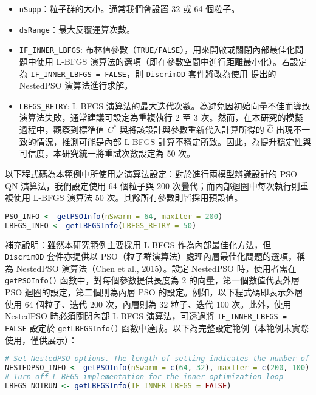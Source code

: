 \begin{itemize}
\item \verb|nSupp|：粒子群的大小。通常我們會設置 32 或 64 個粒子。

\item \verb|dsRange|：最大反覆運算次數。

\item \verb|IF_INNER_LBFGS|: 布林值參數（\verb|TRUE/FALSE|），用來開啟或關閉內部最佳化問題中使用 L-BFGS 演算法的選項（即在參數空間中進行距離最小化）。若設定為 \verb|IF_INNER_LBFGS = FALSE|，則 \verb|DiscrimOD| 套件將改為使用 \cite{chen2015minimax} 提出的 NestedPSO 演算法進行求解。

\item \verb|LBFGS_RETRY|: L-BFGS 演算法的最大迭代次數。為避免因初始向量不佳而導致演算法失敗，通常建議可設定為重複執行 2 至 3 次。然而，在本研究的模擬過程中，觀察到標準值 $C^*$ 與將該設計與參數重新代入計算所得的 $\hat{C}$ 出現不一致的情況，推測可能是內部 L-BFGS 計算不穩定所致。因此，為提升穩定性與可信度，本研究統一將重試次數設定為 50 次。

\end{itemize}

以下程式碼為本範例中所使用之演算法設定：對於進行兩模型辨識設計的 PSO-QN 演算法，我們設定使用 64 個粒子與 200 次疊代；而內部迴圈中每次執行則重複使用 L-BFGS 演算法 50 次。其餘所有參數則皆採用預設值。

\begin{lstlisting}[language=R, caption={設定演算法參數（PSO 與 L-BFGS）}]
PSO_INFO <- getPSOInfo(nSwarm = 64, maxIter = 200)
LBFGS_INFO <- getLBFGSInfo(LBFGS_RETRY = 50)
\end{lstlisting}

補充說明：雖然本研究範例主要採用 L-BFGS 作為內部最佳化方法，但 \verb|DiscrimOD| 套件亦提供以 PSO（粒子群演算法）處理內層最佳化問題的選項，稱為 NestedPSO 演算法（Chen et al., 2015）。設定 NestedPSO 時，使用者需在 \verb|getPSOInfo()| 函數中，對每個參數提供長度為 2 的向量，第一個數值代表外層 PSO 迴圈的設定，第二個則為內層 PSO 的設定。例如，以下程式碼即表示外層使用 64 個粒子、迭代 200 次，內層則為 32 粒子、迭代 100 次。此外，使用 NestedPSO 時必須關閉內部 L-BFGS 演算法，可透過將 \verb|IF_INNER_LBFGS = FALSE| 設定於 \verb|getLBFGSInfo()| 函數中達成。以下為完整設定範例（本範例未實際使用，僅供展示）：

\begin{lstlisting}[language=R, caption={NestedPSO 的替代設定}]
# Set NestedPSO options. The length of setting indicates the number of loops
NESTEDPSO_INFO <- getPSOInfo(nSwarm = c(64, 32), maxIter = c(200, 100))
# Turn off L-BFGS implementation for the inner optimization loop
LBFGS_NOTRUN <- getLBFGSInfo(IF_INNER_LBFGS = FALSE)
\end{lstlisting}

